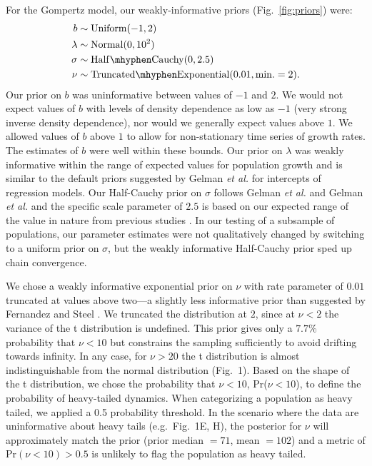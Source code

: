 For the Gompertz model, our weakly-informative priors (Fig.~\ref{fig:priors}) were:
\begin{align}
b &\sim \mathrm{Uniform}(-1, 2)\\ \lambda &\sim \mathrm{Normal}(0, 10^2)\\
\sigma &\sim \mathrm{Half\mhyphen Cauchy} (0, 2.5)\\ \nu &\sim
\mathrm{Truncated\mhyphen Exponential}(0.01, \mathrm{min.} = 2).
\end{align}
Our prior on \(b\) was uninformative between values of \(-1\) and \(2\). We
would not expect values of \(b\) with levels of density dependence as low as
\(-1\) (very strong inverse density dependence), nor would we generally expect
values above \(1\). We allowed values of \(b\) above \(1\) to allow for
non-stationary time series of growth rates. The estimates of \(b\) were well
within these bounds. Our prior on \(\lambda\) was weakly informative within the
range of expected values for population growth and is similar to the default
priors suggested by Gelman \emph{et al.} \citep{gelman2008d} for intercepts of
regression models. Our Half-Cauchy prior on \(\sigma\) follows Gelman \emph{et
al.} \citep{gelman2006c} and Gelman \emph{et al.} \citep{gelman2008d} and the
specific scale parameter of \(2.5\) is based on our expected range of the value
in nature from previous studies \citep{connors2014}. In our testing of a
subsample of populations, our parameter estimates were not qualitatively
changed by switching to a uniform prior on \(\sigma\), but the weakly
informative Half-Cauchy prior sped up chain convergence.

We chose a weakly informative exponential prior on \(\nu\) with rate parameter
of \(0.01\) truncated at values above two---a slightly less informative prior
than suggested by Fernandez and Steel \citep{fernandez1998}. We truncated the
distribution at \(2\), since at \(\nu < 2\) the variance of the t distribution
is undefined. This prior gives only a \(7.7\)\% probability that \(\nu < 10\)
but constrains the sampling sufficiently to avoid drifting towards infinity. In
any case, for \(\nu > 20\) the t distribution is almost indistinguishable from
the normal distribution (Fig.~1). Based on the shape of the t distribution, we
chose the probability that \(\nu < 10\), Pr(\(\nu < 10\)), to define the
probability of heavy-tailed dynamics. When categorizing a population as heavy
tailed, we applied a 0.5 probability threshold. In the scenario where the data
are uninformative about heavy tails (e.g.~Fig.~1E, H), the posterior for
\(\nu\) will approximately match the prior (prior median \(= 71\), mean \(=
102\)) and a metric of Pr\((\nu < 10) > 0.5\) is unlikely to flag the
population as heavy tailed.


